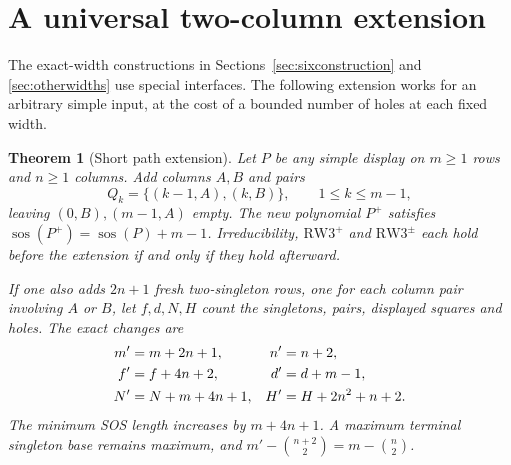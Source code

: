 \documentclass[11pt,a4paper]{article}
\newtheorem{theorem}{Theorem}[section]
\theoremstyle{definition}
\newcommand{\sos}{\operatorname{sos}}
\newcommand{\RW}{\mathrm{RW3}^{+}}
\newcommand{\SG}{\mathrm{RW3}^{\pm}}
\begin{document}
\section{A universal two-column extension}\label{sec:extension}

The exact-width constructions in Sections~\ref{sec:sixconstruction} and
\ref{sec:otherwidths} use special interfaces. The following
extension works for an arbitrary simple input, at the cost of a bounded
number of holes at each fixed width.

\begin{theorem}[Short path extension]\label{thm:extension}
Let $P$ be any simple display on $m\ge1$ rows and $n\ge1$ columns.
Add columns $A,B$ and pairs
\[
 Q_k=\{(k-1,A),(k,B)\},\qquad1\le k\le m-1,
\]
leaving $(0,B),(m-1,A)$ empty. The new polynomial $P^+$ satisfies
$\sos(P^+)=\sos(P)+m-1$. Irreducibility, $\RW$ and $\SG$ each hold
before the extension if and only if they hold afterward.

If one also adds $2n+1$ fresh two-singleton rows, one for each column
pair involving $A$ or $B$, let $f,d,N,H$ count the singletons, pairs,
displayed squares and holes. The exact changes are
\begin{align}\label{eq:extensioncounts}
 m'&=m+2n+1,&n'&=n+2,\notag\\
 f'&=f+4n+2,&d'&=d+m-1,\notag\\
 N'&=N+m+4n+1,&H'&=H+2n^2+n+2.
\end{align}
The minimum SOS length increases by $m+4n+1$. A maximum terminal
singleton base remains maximum, and
$m'-\binom{n+2}{2}=m-\binom n2$.
\end{theorem}
\end{document}
